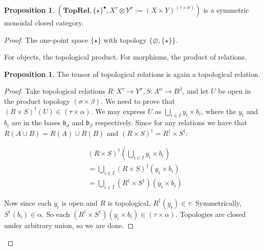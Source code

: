 \documentclass{tufte-handout}
\theoremstyle{definition}
\newtheorem{proposition}[theorem]{Proposition}
\newtheorem{rem}[theorem]{Reminder}
\begin{document}

\begin{proposition}
$(\mathbf{TopRel},\{\star\}^{\bullet},X^\tau \otimes Y^\sigma := (X \times Y)^{(\tau \times \sigma)})$ is a symmetric monoidal closed category.
\begin{proof}

 The one-point space $\{\star\}$ with topology $\{\varnothing,\{\star\}\}$.


 For objects, the topological product. For morphisms, the product of relations. 

\begin{proposition}
The tensor of topological relations is again a topological relation.
\begin{proof}
Take topological relations $R: X^\tau \rightarrow Y^\sigma, S: A^\alpha \rightarrow B^\beta$, and let $U$ be open in the product topology $(\sigma \times \beta)$. We need to prove that $(R \times S)^\dag(U) \in (\tau \times \alpha)$. We may express $U$ as $\bigcup\limits_{i \in I} y_i \times b_i$, where the $y_i$ and $b_i$ are in the bases $\mathfrak{b}_\sigma$ and $\mathfrak{b}_\beta$ respectively. Since for any relations we have that $R(A \cup B) = R(A) \cup R(B)$ and $(R \times S)^\dag = R^\dag \times S^\dag$:

\begin{align*}
&(R \times S)^\dag(\bigcup\limits_{i \in I} y_i \times b_i)\\
 &= \bigcup\limits_{i \in I}(R \times S)^\dag(y_i \times b_i)\\
 &= \bigcup\limits_{i \in I}(R^\dag \times S^\dag)(y_i \times b_i)
 \end{align*}

Now since each $y_i$ is open and $R$ is topological, $R^\dag(y_i) \in \tau$. Symmetrically, $S^\dag(b_i) \in \alpha$. So each $(R^\dag \times S^\dag)(y_i \times b_i) \in (\tau \times \alpha)$. Topologies are closed under arbitrary union, so we are done.
\end{proof}
\end{proposition}



\end{proof}
\end{proposition}
\end{document}
